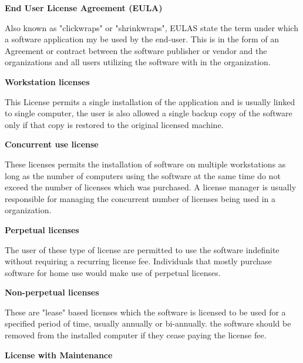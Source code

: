\documentclass[12pt, onecolumn]{witseiepaper}
\begin{document}
\textbf{End User License Agreement (EULA)}


Also known as "clickwraps" or "shrinkwraps", EULAS state the term under which a software application my be used by the end-user.  This is in the form of an Agreement or contract between the software publisher or vendor and the organizations and all users utilizing the software with in the organization.

\textbf{Workstation licenses}


This License permits a single installation of the application and is usually linked to single computer, the user is also allowed a single backup copy of the software only if that copy is restored to the original licensed machine.
  
\textbf{Concurrent use license}


These licenses permits the installation of software on multiple workstations as long as the number of computers using the software at the same time do not exceed the number of licenses which was purchased.
A license manager is usually responsible for managing the concurrent number of licenses being used in a organization. 


\textbf{Perpetual licenses}

The user of these type of license are permitted to use the software indefinite without requiring a recurring license fee.  Individuals that mostly purchase software for home use would make use of perpetual licenses.

\textbf{Non-perpetual licenses}

These are "lease" based licenses which the software is licensed to be used for a specified period of time, usually annually or bi-annually. the software should be removed from the installed computer if they cease paying the license fee.


\textbf{License with Maintenance}
\end{document}

